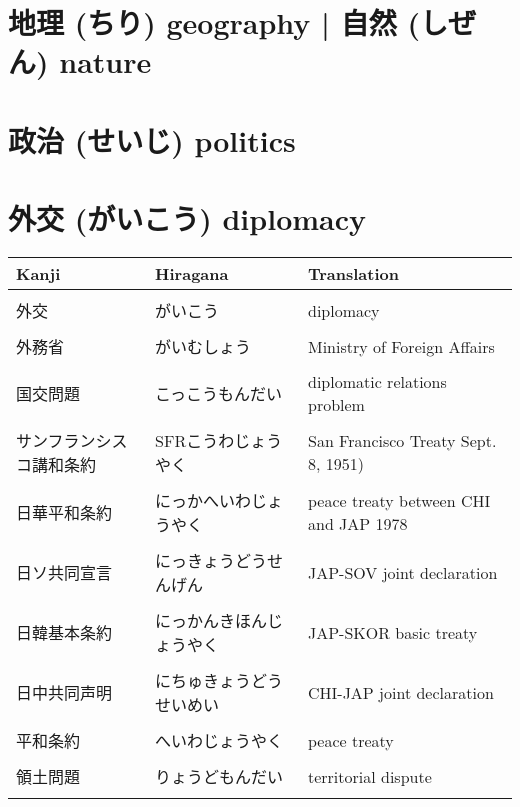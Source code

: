 \documentclass{article}
\begin{document}
 \large

\section{地理 (ちり) geography	| 自然 (しぜん) nature}
\section{政治 (せいじ) politics}
\section{外交 (がいこう) diplomacy}
    \begin{tabular}{  l | l | p{7.5cm} }
 Kanji 			& Hiragana 			& Translation \\[5pt] \hline	\\[-1em]
 外交 			& がいこう 				& diplomacy   \\ \hline	\\[-1em]
 外務省			& がいむしょう			& Ministry of Foreign Affairs \\ \hline \\[-1em]
 国交問題			& こっこうもんだい			& diplomatic relations problem \\ \hline \\[-1em]
 サンフランシスコ講和条約  & SFRこうわじょうやく & San Francisco Treaty Sept. 8, 1951)\\ \hline \\[-1em]
 日華平和条約		& にっかへいわじょうやく  & peace treaty between CHI and JAP 1978\\ \hline \\[-1em]
 日ソ共同宣言				& にっきょうどうせんげん 	& JAP-SOV joint declaration \\ \hline \\[-1em]
 日韓基本条約				& にっかんきほんじょうやく	& JAP-SKOR basic treaty\\ \hline \\[-1em]
 日中共同声明				& にちゅきょうどうせいめい	& CHI-JAP joint declaration \\ \hline \\[-1em]
 平和条約					& へいわじょうやく 		& peace treaty \\ \hline \\[-1em]
 領土問題					& りょうどもんだい			& territorial dispute \\ \hline \\[-1em]

\end{tabular}
\end{document}
